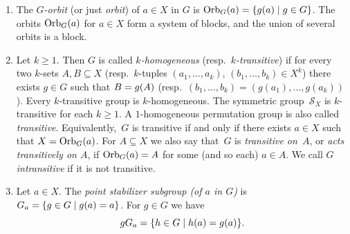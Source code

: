 \begin{enumerate}
	\item The \emph{$G$-orbit} (or just \emph{orbit}) of $a \in X$ in $G$ is $\Orbit{a}{G} = \{ \applyfunc{a}{g} \mid g \in G\}$. The orbits $\Orbit{a}{G}$ for $a \in X$ form a system of blocks,
	and the union of several orbits is a block.
	\label{def:orbit}
		
	\item Let $k \ge 1$. Then $G$ is called 
	\emph{$k$-homogeneous} (resp.~\emph{$k$-transitive})
	if for every two $k$-sets $A, B \subseteq X$ (resp.~$k$-tuples $(a_1, \ldots, a_k)$, $(b_1, \ldots, b_k) \in X^k$)
	there exists $g \in G$ such that 
	$B = \applyfunc{A}{g}$ (resp.~$(b_1, \ldots, b_k) = (g(a_1), \ldots, g(a_k))$).
	Every $k$-transitive group is $k$-homogeneous.
	The symmetric group~$\mathcal S_{X}$ is $k$-transitive 
	for each $k \ge 1$.
	A $1$-homogeneous permutation group is also called \emph{transitive}.
	Equivalently,~$G$ is transitive  
	if and only if there exists $a \in X$
	such that $X = \Orbit{a}{G}$. 
	For $A \subseteq X$ we also say that~$G$ is \emph{transitive on~$A$}, or \emph{acts transitively on $A$},
	if $\Orbit{a}{G} = A$ for some (and so each) $a \in A$.	
	We call $G$ \emph{intransitive} if it is not transitive.
	
	\item Let $a \in X$. The \emph{point stabilizer subgroup (of $a$ in $G$)} is $\Stab{a}{G} = \{ g \in G \mid \applyfunc{a}{g} = a \}$. \label{def:stabilizer}
	For $g \in G$ we have 
	\begin{equation}\label{prelim:coset-point-stab}
		g\Stab{a}{G} = \{ h \in G \mid \applyfunc{a}{h} = \applyfunc{a}{g} \}.
	\end{equation}
			

\end{enumerate}
